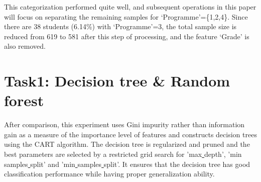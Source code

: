 \documentclass[journal]{IEEEtai}
\begin{document}
This categorization performed quite well, and subsequent operations in this paper will focus on separating the remaining samples for `Programme'=\{1,2,4\}. Since there are 38 students (6.14\%) with `Programme'=3, the total sample size is reduced from 619 to 581 after this step of processing, and the feature `Grade' is also removed.

\section{\textbf{Task1: Decision tree \& Random forest}}
After comparison, this experiment uses Gini impurity rather than information gain as a measure of the importance level of features and constructs decision trees using the CART algorithm. The decision tree is regularized and pruned and the best parameters are selected by a restricted grid search for 'max\underline{ }depth', 'min\underline{ }samples\underline{ }split' and 'min\underline{ }samples\underline{ }split'. It ensures that the decision tree has good classification performance while having proper generalization ability.
\end{document}
